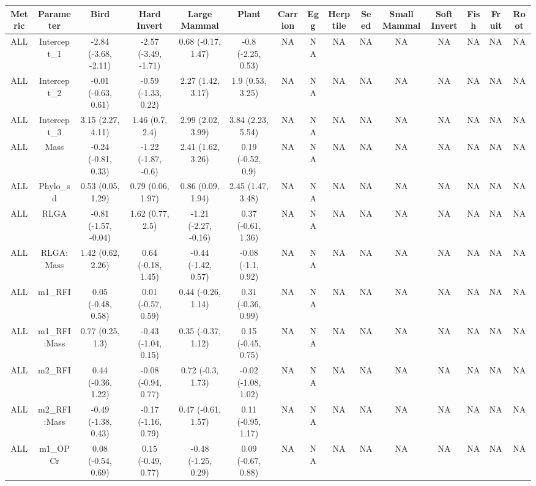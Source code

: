 \begingroup\fontsize{5}{7}\selectfont

\begin{longtable}[t]{c|c|c|c|c|c|c|c|c|c|c|c|c|c|c}
\hline
Metric & Parameter & Bird & Hard Invert & Large Mammal & Plant & Carrion & Egg & Herptile & Seed & Small Mammal & Soft Invert & Fish & Fruit & Root\\
\hline
ALL & Intercept_1 & -2.84 (-3.68, -2.11) & -2.57 (-3.49, -1.71) & 0.68 (-0.17, 1.47) & -0.8 (-2.25, 0.53) & NA & NA & NA & NA & NA & NA & NA & NA & NA\\
\hline
ALL & Intercept_2 & -0.01 (-0.63, 0.61) & -0.59 (-1.33, 0.22) & 2.27 (1.42, 3.17) & 1.9 (0.53, 3.25) & NA & NA & NA & NA & NA & NA & NA & NA & NA\\
\hline
ALL & Intercept_3 & 3.15 (2.27, 4.11) & 1.46 (0.7, 2.4) & 2.99 (2.02, 3.99) & 3.84 (2.23, 5.54) & NA & NA & NA & NA & NA & NA & NA & NA & NA\\
\hline
ALL & Mass & -0.24 (-0.81, 0.33) & -1.22 (-1.87, -0.6) & 2.41 (1.62, 3.26) & 0.19 (-0.52, 0.9) & NA & NA & NA & NA & NA & NA & NA & NA & NA\\
\hline
ALL & Phylo_sd & 0.53 (0.05, 1.29) & 0.79 (0.06, 1.97) & 0.86 (0.09, 1.94) & 2.45 (1.47, 3.48) & NA & NA & NA & NA & NA & NA & NA & NA & NA\\
\hline
ALL & RLGA & -0.81 (-1.57, -0.04) & 1.62 (0.77, 2.5) & -1.21 (-2.27, -0.16) & 0.37 (-0.61, 1.36) & NA & NA & NA & NA & NA & NA & NA & NA & NA\\
\hline
ALL & RLGA:Mass & 1.42 (0.62, 2.26) & 0.64 (-0.18, 1.45) & -0.44 (-1.42, 0.57) & -0.08 (-1.1, 0.92) & NA & NA & NA & NA & NA & NA & NA & NA & NA\\
\hline
ALL & m1_RFI & 0.05 (-0.48, 0.58) & 0.01 (-0.57, 0.59) & 0.44 (-0.26, 1.14) & 0.31 (-0.36, 0.99) & NA & NA & NA & NA & NA & NA & NA & NA & NA\\
\hline
ALL & m1_RFI:Mass & 0.77 (0.25, 1.3) & -0.43 (-1.04, 0.15) & 0.35 (-0.37, 1.12) & 0.15 (-0.45, 0.75) & NA & NA & NA & NA & NA & NA & NA & NA & NA\\
\hline
ALL & m2_RFI & 0.44 (-0.36, 1.22) & -0.08 (-0.94, 0.77) & 0.72 (-0.3, 1.73) & -0.02 (-1.08, 1.02) & NA & NA & NA & NA & NA & NA & NA & NA & NA\\
\hline
ALL & m2_RFI:Mass & -0.49 (-1.38, 0.43) & -0.17 (-1.16, 0.79) & 0.47 (-0.61, 1.57) & 0.11 (-0.95, 1.17) & NA & NA & NA & NA & NA & NA & NA & NA & NA\\
\hline
ALL & m1_OPCr & 0.08 (-0.54, 0.69) & 0.15 (-0.49, 0.77) & -0.48 (-1.25, 0.29) & 0.09 (-0.67, 0.88) & NA & NA & NA & NA & NA & NA & NA & NA & NA\\

\end{longtable}
